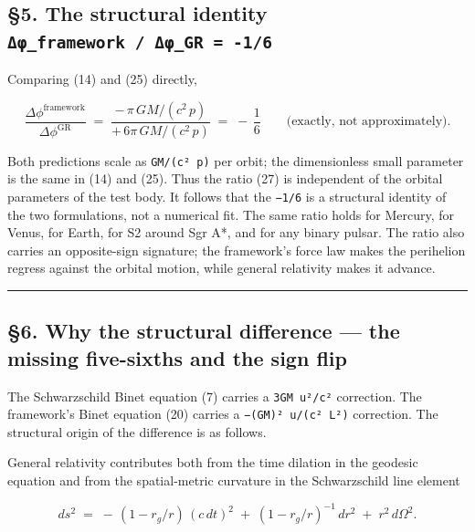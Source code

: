 \documentclass[
  11pt,
]{article}
\begin{document}
\hypertarget{the-structural-identity-ux3b4ux3c6_framework-ux3b4ux3c6_gr--16}{%
\subsection{\texorpdfstring{§5. The structural identity
\texttt{Δφ\_framework\ /\ Δφ\_GR\ =\ -1/6}}{§5. The structural identity Δφ\_framework / Δφ\_GR = -1/6}}\label{the-structural-identity-ux3b4ux3c6_framework-ux3b4ux3c6_gr--16}}

Comparing (14) and (25) directly,

\[
\frac{\Delta\phi^{\text{framework}}}{\Delta\phi^{\text{GR}}}
\;=\; \frac{-\,\pi\,GM/(c^{2}\,p)}{+\,6\pi\,GM/(c^{2}\,p)}
\;=\; -\,\frac{1}{6}\qquad\text{(exactly, not approximately).} \tag{27}
\]

Both predictions scale as \texttt{GM/(c²\ p)} per orbit; the
dimensionless small parameter is the same in (14) and (25). Thus the
ratio (27) is independent of the orbital parameters of the test body. It
follows that the \texttt{−1/6} is a structural identity of the two
formulations, not a numerical fit. The same ratio holds for Mercury, for
Venus, for Earth, for S2 around Sgr A*, and for any binary pulsar. The
ratio also carries an opposite-sign signature; the framework's force law
makes the perihelion regress against the orbital motion, while general
relativity makes it advance.

\begin{center}\rule{0.5\linewidth}{0.5pt}\end{center}

\hypertarget{why-the-structural-difference-the-missing-five-sixths-and-the-sign-flip}{%
\subsection{§6. Why the structural difference --- the missing
five-sixths and the sign
flip}\label{why-the-structural-difference-the-missing-five-sixths-and-the-sign-flip}}

The Schwarzschild Binet equation (7) carries a \texttt{3GM\ u²/c²}
correction. The framework's Binet equation (20) carries a
\texttt{−(GM)²\ u/(c²\ L²)} correction. The structural origin of the
difference is as follows.

General relativity contributes both from the time dilation in the
geodesic equation and from the spatial-metric curvature in the
Schwarzschild line element

\[
ds^{2} \;=\; -\,(1 - r_{g}/r)\,(c\,dt)^{2} \;+\; (1 - r_{g}/r)^{-1}\,dr^{2} \;+\; r^{2}\,d\Omega^{2}. \tag{28}
\]
\end{document}
